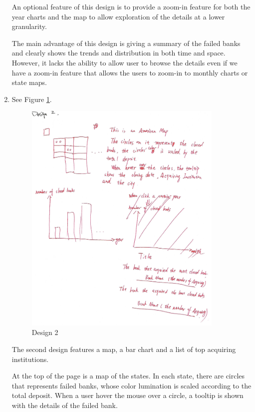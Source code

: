 \begin{enumerate}
        An optional feature of this design is to provide a zoom-in feature for
        both the year charts and the map to allow exploration of the details
        at a lower granularity.

        The main advantage of this design is giving a summary of the failed
        banks and clearly shows the trends and distribution in both time and
        space. However, it lacks the ability to allow user to browse the
        details even if we have a zoom-in feature that allows the users to
        zoom-in to monthly charts or state maps.

    \item See Figure \ref{fig:design_2}.

        \begin{figure}[!h]
            \centering
            \includegraphics[width=0.9\textwidth]{fig/design_2}
            \caption{Design 2}
            \label{fig:design_2}
        \end{figure}

        The second design features a map, a bar chart and a list of top
        acquiring institutions.

        At the top of the page is a map of the states. In each state, there
        are circles that represents failed banks, whose color lumination is
        scaled according to the total deposit. When a user hover the mouse
        over a circle, a tooltip is shown with the details of the failed bank.


\end{enumerate}
